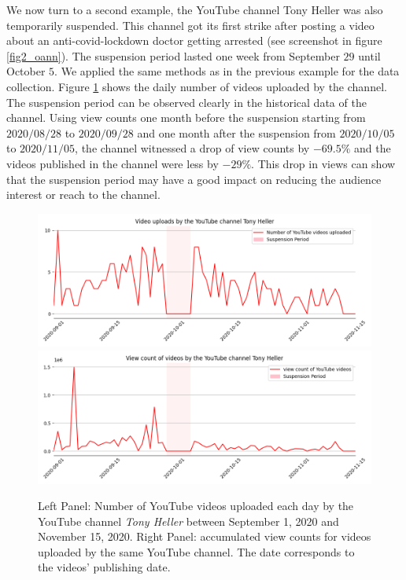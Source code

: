 \documentclass{article}
\begin{document}
We now turn to a
second example, the YouTube channel Tony Heller was also temporarily suspended. 
This channel got its first strike after posting a video about an anti-covid-lockdown doctor getting arrested (see screenshot in figure \ref{fig2_oann}). The suspension period lasted one week from September $29$ until October $5$.
We applied the same methods as in the previous example for the data collection. Figure \ref{fig1_tony} shows the daily number of videos uploaded by the channel. The suspension period can be observed clearly in the historical data of the channel.  
Using view counts one month before the suspension starting from $2020/08/28$ to $2020/09/28$ and one month after the suspension from $2020/10/05$ to $2020/11/05$, the channel witnessed a drop of view counts by $-69.5\%$ and the videos published in the channel were less by $-29\%$. This drop in views can show that the  suspension  period
may  have  a  good  impact  on  reducing  the  audience interest or reach to the channel.

\begin{figure}[h]
\hspace{-2em}
			\includegraphics[scale=0.32]{../figure/Tony_Heller_videos_yt.png}
			\includegraphics[scale=0.32]{../figure/Tony_Heller_views_yt.png}
	\caption{Left Panel: Number of YouTube videos uploaded each day by the YouTube channel {\it Tony Heller} between September 1, 2020 and November 15, 2020. Right Panel: accumulated view counts for videos uploaded by the same YouTube channel. The date corresponds to the videos’  publishing date. 
}
	\label{fig1_tony}
\end{figure}
\end{document}
